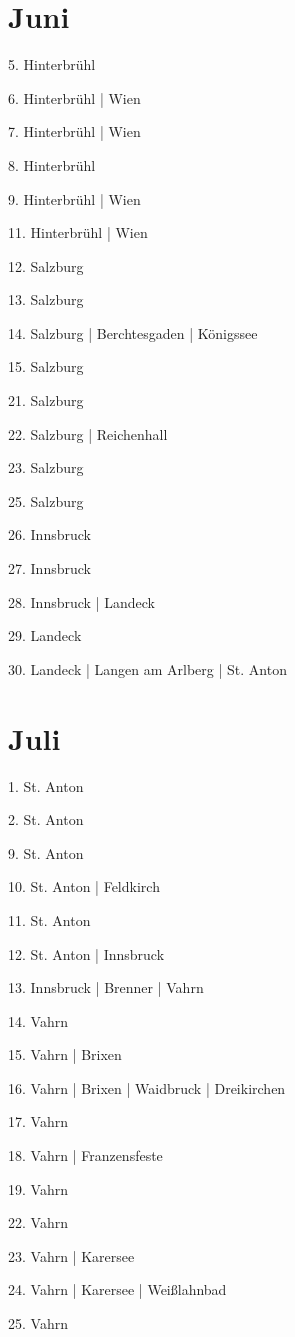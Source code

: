 \documentclass[twoside=false,titlepage=false,open=any, parskip=never, fontsize=10pt, headings=small, chapterprefix=false, appendixprefix=false, DIV=15]{scrbook}
\begin{document}
\begin{multicols}{3}
            \section*{Juni}
            5. Hinterbrühl\par
            6. Hinterbrühl | Wien\par
            7. Hinterbrühl | Wien\par
            8. Hinterbrühl\par
            9. Hinterbrühl | Wien\par
            11. Hinterbrühl | Wien\par
            12. Salzburg\par
            13. Salzburg\par
            14. Salzburg | Berchtesgaden | Königssee\par
            15. Salzburg\par
            21. Salzburg\par
            22. Salzburg | Reichenhall\par
            23. Salzburg\par
            25. Salzburg\par
            26. Innsbruck\par
            27. Innsbruck\par
            28. Innsbruck | Landeck\par
            29. Landeck\par
            30. Landeck | Langen am Arlberg | St. Anton\par
            \section*{Juli}
            1. St. Anton\par
            2. St. Anton\par
            9. St. Anton\par
            10. St. Anton | Feldkirch\par
            11. St. Anton\par
            12. St. Anton | Innsbruck\par
            13. Innsbruck | Brenner | Vahrn\par
            14. Vahrn\par
            15. Vahrn | Brixen\par
            16. Vahrn | Brixen | Waidbruck | Dreikirchen\par
            17. Vahrn\par
            18. Vahrn | Franzensfeste\par
            19. Vahrn\par
            22. Vahrn\par
            23. Vahrn | Karersee\par
            24. Vahrn | Karersee | Weißlahnbad\par
            25. Vahrn\par

\end{multicols}
\end{document}
